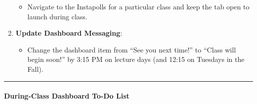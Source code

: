 \documentclass[
]{article}
\providecommand{\tightlist}{%
  \setlength{\itemsep}{0pt}\setlength{\parskip}{0pt}}
\begin{document}
\begin{enumerate}
  \begin{itemize}
  \tightlist
  \item
    Navigate to the Instapolls for a particular class and keep the tab open to launch during class.\\
  \end{itemize}
\item
  \textbf{Update Dashboard Messaging}:

  \begin{itemize}
  \tightlist
  \item
    Change the dashboard item from ``See you next time!'' to ``Class will begin soon!'' by 3:15 PM on lecture days (and 12:15 on Tuesdays in the Fall).
  \end{itemize}
\end{enumerate}

\begin{center}\rule{0.5\linewidth}{0.5pt}\end{center}

\hypertarget{during-class-dashboard-to-do-list}{%
\paragraph{During-Class Dashboard To-Do List}\label{during-class-dashboard-to-do-list}}
\end{document}
